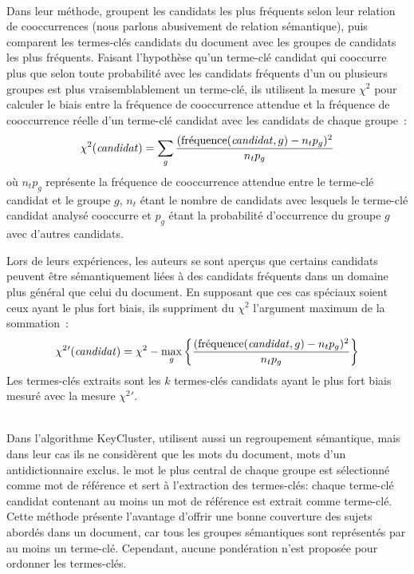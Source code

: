         ~\\Dans leur méthode,  groupent les
        candidats les plus fréquents selon leur relation de cooccurrences (nous
        parlons abusivement de relation sémantique), puis comparent les
        termes-clés candidats du document avec les groupes de candidats les plus
        fréquents. Faisant l'hypothèse qu'un terme-clé candidat qui cooccurre
        plus que selon toute probabilité avec les candidats fréquents d'un ou
        plusieurs groupes est plus vraisemblablement un terme-clé, ils utilisent
        la mesure $\chi^2$ pour calculer le biais entre la fréquence de
        cooccurrence attendue et la fréquence de cooccurrence réelle d'un
        terme-clé candidat avec les candidats de chaque groupe~:
        \begin{align}
          \chi^2(\text{\textit{candidat}}) = \sum_{g} \frac{(\text{fréquence}(\text{\textit{candidat}}, g) - n_tp_g)^2}{n_tp_g}
        \end{align}
        où $n_tp_g$ représente la fréquence de cooccurrence attendue entre le
        terme-clé candidat et le groupe $g$, $n_t$ étant le nombre de candidats
        avec lesquels le terme-clé candidat analysé cooccurre et $p_g$ étant la
        probabilité d'occurrence du groupe $g$ avec d'autres candidats.
        
        Lors de leurs expériences, les auteurs se sont aperçus que certains
        candidats peuvent être sémantiquement liées à des candidats fréquents
        dans un domaine plus général que celui du document. En supposant que ces
        cas spéciaux soient ceux ayant le plus fort biais, ils suppriment du
        $\chi^2$ l'argument maximum de la sommation~:
        \begin{align}
          \chi^2{'}(\text{\textit{candidat}}) = \chi^2 - \max_{g}\left\{\frac{(\text{fréquence}(\text{\textit{candidat}}, g) - n_tp_g)^2}{n_tp_g}\right\}
        \end{align}
        Les termes-clés extraits sont les $k$ termes-clés candidats ayant le
        plus fort biais mesuré avec la mesure $\chi^2{'}$.

        ~\\Dans l'algorithme KeyCluster,  utilisent
        aussi un regroupement sémantique, mais dans leur cas ils ne considèrent
        que les mots du document, mots d'un antidictionnaire exclus. le mot le
        plus central de chaque groupe est sélectionné comme mot de référence et
        sert à l'extraction des termes-clés: chaque terme-clé candidat contenant
        au moins un mot de référence est extrait comme terme-clé. Cette méthode
        présente l'avantage d'offrir une bonne couverture des sujets abordés
        dans un document, car tous les groupes sémantiques sont représentés par
        au moins un terme-clé. Cependant, aucune pondération n'est proposée pour
        ordonner les termes-clés.

